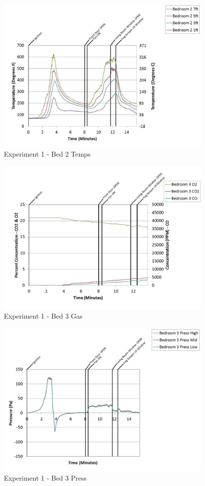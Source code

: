 \documentclass{article}
\begin{document}
\begin{appendices}
	\clearpage

	\begin{figure}[h!]
		\centering
		\includegraphics[height=3.05in]{0_Images/Results_Charts/Exp_1_Charts/Bed2Temps.pdf}
		\caption{Experiment 1 - Bed 2 Temps}
	\end{figure}
 

	\begin{figure}[h!]
		\centering
		\includegraphics[height=3.05in]{0_Images/Results_Charts/Exp_1_Charts/Bed3Gas.pdf}
		\caption{Experiment 1 - Bed 3 Gas}
	\end{figure}
 
	\clearpage

	\begin{figure}[h!]
		\centering
		\includegraphics[height=3.05in]{0_Images/Results_Charts/Exp_1_Charts/Bed3Press.pdf}
		\caption{Experiment 1 - Bed 3 Press}
	\end{figure}
 


\end{appendices}
\end{document}
